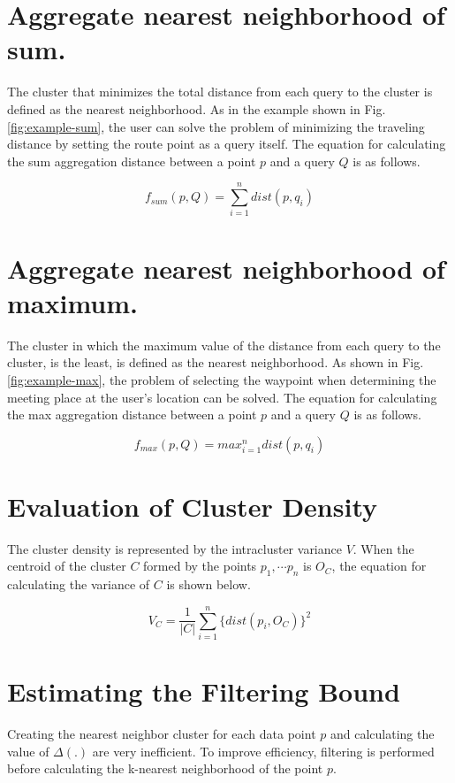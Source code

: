\documentclass[a4paper,11pt]{report}
\theoremstyle{mytheoremstyle}
\begin{document}
\section{Aggregate nearest neighborhood of sum.}
The cluster that minimizes the total distance from each query to the cluster is defined as the nearest neighborhood. As in the example shown in Fig. \ref{fig:example-sum}, the user can solve the problem of minimizing the traveling distance by setting the route point as a query itself. The equation for calculating the sum aggregation distance between a point $p$ and a query $Q$ is as follows.

\begin{equation}
\label{equ:f-sum}
f_{sum}(p,Q) = \sum_{i=1}^{n} dist(p,q_i)
\end{equation}

\section{Aggregate nearest neighborhood of maximum.}

The cluster in which the maximum value of the distance from each query to the cluster, is the least, is defined as the nearest neighborhood. As shown in Fig. \ref{fig:example-max}, the problem of selecting the waypoint when determining the meeting place at the user's location can be solved. The equation for calculating the max aggregation distance between a point $p$ and a query $Q$ is as follows.

\begin{equation}
\label{equ:f-max}
f_{max}(p,Q) = max_{i=1}^{n} dist(p,q_i)
\end{equation}

\section{Evaluation of Cluster Density}
The cluster density is represented by the intracluster variance $V$. When the centroid of the cluster $C$ formed by the points $p_1, \cdots p_n$ is $O_C$, the equation for calculating the variance of $C$ is shown below.

\begin{equation}
\label{equ:w}
V_C = \frac{1}{|C|} \sum_{i=1}^{n} \{dist(p_i, O_C)\}^2 
\end{equation}

\section{Estimating the Filtering Bound}
\label{subsection:filtering}
Creating the nearest neighbor cluster for each data point $p$ and calculating the value of $\Delta(.)$ are very inefficient. To improve efficiency, filtering is performed before calculating the k-nearest neighborhood of the point $p$.
\end{document}
